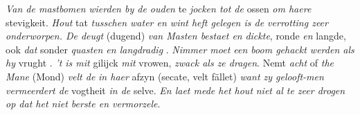 \pend 
\pstart \textit{Van de mastbomen}\protect{} \textit{wierden by de ouden} te \textit{jocken tot de} ossen  \textit{om haere} stevigkeit. \textit{Hout}\protect{} tat \textit{tusschen water en wint heft gelegen is de verrotting zeer onderworpen. De deugt} (dugend) \textit{van Masten bestaet en}  \textit{dickte}, ronde \textit{en} langde, ook \textit{dat} sonder \textit{quasten en langdradig} . \textit{Nimmer moet een boom gehackt werden als hy} vrught . \textit{'t is mit}  gilijck \textit{mit} vrowen, \textit{zwack als ze dragen}. Nemt \textit{acht} of \textit{the Mane}\protect{} (Mond\protect{}) \textit{velt de}  \textit{in haer} afzyn (secate, velt f\"{a}llet) \textit{want zy gelooft-men vermeerdert de} vogtheit \textit{in de} selve. \textit{En laet mede het hout}\protect{} \textit{niet al te zeer drogen op dat het niet berste en vermorzele}.
\pend 
